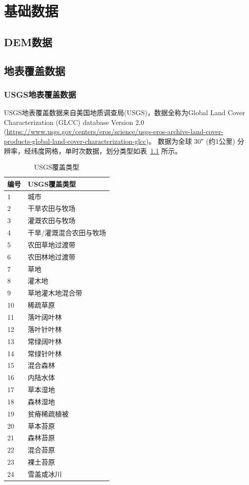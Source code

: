 \chapter{基础数据}\label{基础数据}


\section{DEM数据}

\section{地表覆盖数据}\label{地表覆盖数据}
\subsection{USGS地表覆盖数据}\label{USGS地表覆盖数据}
USGS地表覆盖数据来自美国地质调查局(USGS)，数据全称为Global Land Cover Characterization (GLCC) database Version 2.0 
(\url{https://www.usgs.gov/centers/eros/science/usgs-eros-archive-land-cover-products-global-land-cover-characterization-glcc})。
数据为全球 \ang{;;30} (约1公里) 分辨率，经纬度网格，单时次数据，划分类型如表~\ref{tab:USGS覆盖类型} 所示。
\begin{table}[]
\centering
\caption{USGS覆盖类型}
\label{tab:USGS覆盖类型}
\begin{tabular}{@{}ll@{}}
\toprule
编号 & USGS覆盖类型     \\ \midrule
1  & 城市           \\
2  & 干旱农田与牧场      \\
3  & 灌溉农田与牧场      \\
4  & 干旱/灌溉混合农田与牧场 \\
5  & 农田草地过渡带      \\
6  & 农田林地过渡带      \\
7  & 草地           \\
8  & 灌木地          \\
9  & 草地灌木地混合带     \\
10 & 稀疏草原         \\
11 & 落叶阔叶林        \\
12 & 落叶针叶林        \\
13 & 常绿阔叶林        \\
14 & 常绿针叶林        \\
15 & 混合森林         \\
16 & 内陆水体         \\
17 & 草本湿地         \\
18 & 森林湿地         \\
19 & 贫瘠稀疏植被       \\
20 & 草本苔原         \\
21 & 森林苔原         \\
22 & 混合苔原         \\
23 & 裸土苔原         \\
24 & 雪盖或冰川        \\ \bottomrule
\end{tabular}
\end{table}


